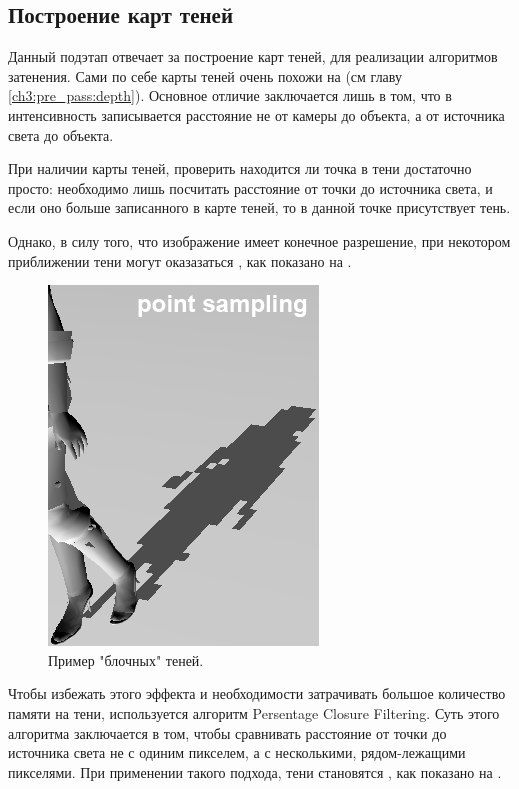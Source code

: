 	\subsection{Построение карт теней} \label{ch3:pre_pass:shadow_maps}
		Данный подэтап отвечает за построение карт теней, для реализации алгоритмов затенения. Сами по себе карты теней очень похожи на  (см главу \ref{ch3:pre_pass:depth}). Основное отличие заключается лишь в том, что в интенсивность записывается расстояние не от камеры до объекта, а от источника света до объекта.
		
		При наличии карты теней, проверить находится ли точка в тени достаточно просто: необходимо лишь посчитать расстояние от точки до источника света, и если оно больше записанного в карте теней, то в данной точке присутствует тень.
		
		Однако, в силу того, что изображение имеет конечное разрешение, при некотором приближении тени могут оказазаться , как показано на .
		 
		 \begin{figure}[ht!] 
		 	\center
		 	\includegraphics [scale=1] {my_folder/images//blocky_shadows}	
		 	\caption{Пример "блочных" теней.} 
		 	\label{fig:blocky_shadows}
		 \end{figure}
		 
		 Чтобы избежать этого эффекта и необходимости затрачивать большое количество памяти на тени, используется алгоритм Persentage Closure Filtering. Суть этого алгоритма заключается в том, чтобы сравнивать расстояние от точки до источника света не с одиним пикселем, а с несколькими, рядом-лежащими пикселями. При применении такого подхода, тени становятся , как показано на .
		 
